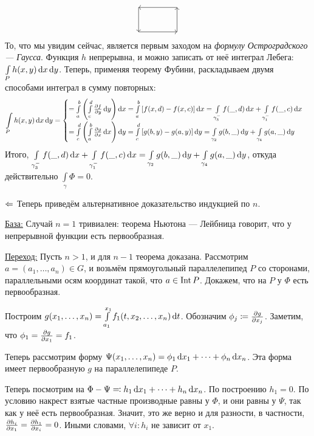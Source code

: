 \documentclass[a4paper]{report}
\begin{document}
{{\[\begin{tikzpicture}
              \draw[->] (0,0) -- (1.6, 0);
              \draw[->] (1.6,0) -- (1.6, 1);
              \draw[->] (1.6,1) -- (0, 1);
              \draw[->] (0,1) -- (0, 0);
        \end{tikzpicture}\]
        То, что мы увидим сейчас, является первым заходом на \emph{формулу Остроградского --- Гаусса}.
        Функция $h$ непрерывна, и можно записать от неё интеграл Лебега:  $\int\limits_{P}h(x, y)\operatorname{d}\! x \operatorname{d}\! y$. %
        Теперь, применяя теорему Фубини, раскладываем двумя способами интеграл в сумму повторных:
        \[\int\limits_{P}h(x, y)\d x \d y =\all{=\int\limits_{a}^{b}\left(\int\limits_{c}^{d}\der{f}{y}\d y\right)\d x= \int\limits_{a}^{b}\left[f(x, d) - f(x, c)\right]\d x =\int\limits_{\gamma_3^-}f(\_, d)\d x + \int\limits_{\gamma_1^-}f(\_, c)\d x\\=\int\limits_{c}^{d}\left(\int\limits_{a}^{b}\der{g}{x}\d x\right)\d y = \int\limits_{c}^{d}\left[g(b, y) - g(a, y)\right]\d y = \int\limits_{\gamma_2}g(b, \_)\d y + \int\limits_{\gamma_4}g(a, \_)\d y}\]
        Итого, $\int\limits_{\gamma_3^-}f(\_, d)\operatorname{d}\! x + \int\limits_{\gamma_1^-}f(\_, c)\operatorname{d}\! x = \int\limits_{\gamma_2}g(b, \_)\operatorname{d}\! y + \int\limits_{\gamma_4}g(a, \_)\operatorname{d}\! y$, откуда действительно $\int\limits_{\gamma}\Phi = 0$.
    \item[$\Leftarrow$] Теперь приведём альтернативное доказательство индукцией по $n$.

    \underline{База:} Случай $n = 1$ тривиален: теорема Ньютона --- Лейбница говорит, что у непрерывной функции есть первообразная.

    \underline{Переход:} Пусть $n > 1$, и для $n - 1$ теорема доказана.
    Рассмотрим $a = (a_1, \dots, a_n) \in G$, и возьмём прямоугольный параллелепипед $P$ со сторонами, параллельными осям координат такой, что $a \in \operatorname{Int} P$.
        Докажем, что на $P$ у $\Phi$ есть первообразная.

    Построим $g(x_1, \dots, x_n) = \int\limits_{a_1}^{x_1}f_1(t, x_2, \dots, x_n)\operatorname{d}\! t$. Обозначим $\phi_j \coloneqq \frac{\partial g}{\partial x_j}$.
        Заметим, что $\phi_1 = \frac{\partial g}{\partial x_1} = f_1$.

    Теперь рассмотрим форму $\Psi(x_1, \dots, x_n) = \phi_1 \operatorname{d}\! x_1 + \dots + \phi_n \operatorname{d}\! x_n$.
        Эта форма имеет первообразную $g$ на параллелепипеде $P$.

    Теперь посмотрим на $\Phi - \Psi \eqqcolon h_1 \operatorname{d}\! x_1 + \dots + h_n \operatorname{d}\! x_n$.
        По построению $h_1 = 0$.
        По условию накрест взятые частные производные равны у $\Phi$, и они равны у $\Psi$, так как у неё есть первообразная.
    Значит, это же верно и для разности, в частности, $\frac{\partial h_i}{\partial x_1} = \frac{\partial h_1}{\partial x_i} = 0$.
        Иными словами, $\forall i: h_i$ не зависит от $x_1$.

}}
\end{document}

